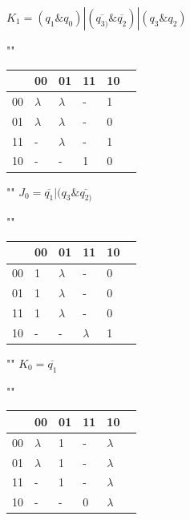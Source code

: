 \documentclass[a4paper,12pt]{article}
\begin{document}
\begin{center}
	\clearpage
	$K_{1} = (q_{1} \& q_{0}) | (\overline{q_{3)}} \& \overline{q_{2}}) | (q_{3} \& q_{2})$
	
	""\newline
	\begin{tabular}{ | l | l | l | l | l | p{1cm} |}
		\hline
		\diagbox[width=5em]{$q_{3}q_{2}$}{$q_{1}q_{0}$} & 00 & 01 & 11 & 10 \\\hline
		00 & \cellcolor{blue!25} $\lambda$  & \cellcolor{blue!25} $\lambda$  & \cellcolor{blue!25} - & \cellcolor{blue!25} 1  \\\hline
		01 & $\lambda$  &  $\lambda$  & \cellcolor{blue!25} - & 0  \\\hline
		11 & \cellcolor{blue!25} -  & \cellcolor{blue!25} $\lambda$  & \cellcolor{blue!25} - & \cellcolor{blue!25} 1  \\\hline
		10 & -  & - & \cellcolor{blue!25} 1  & 0  \\ 
		\hline
	\end{tabular}

	""\newline\newline
	$J_{0} = \overline{q_{1}} | (q_{3} \& \overline{q_{2)}}$
	
	""\newline
	\begin{tabular}{ | l | l | l | l | l | p{1cm} |}
		\hline
		\diagbox[width=5em]{$q_{3}q_{2}$}{$q_{1}q_{0}$} & 00 & 01 & 11 & 10 \\\hline
		00 & \cellcolor{blue!25} 1  & \cellcolor{blue!25} $\lambda$  & - & 0  \\\hline
		01 & \cellcolor{blue!25} 1  & \cellcolor{blue!25} $\lambda$  & - & 0  \\\hline
		11 & \cellcolor{blue!25} 1  & \cellcolor{blue!25} $\lambda$  & - & 0  \\\hline
		10 & \cellcolor{blue!25} -  & \cellcolor{blue!25} - & \cellcolor{blue!25} $\lambda$  & \cellcolor{blue!25} 1  \\ 
		\hline
	\end{tabular}

	""\newline\newline
	$K_{0} = \overline{q_{1}}$
	
	""\newline
	\begin{tabular}{ | l | l | l | l | l | p{1cm} |}
		\hline
		\diagbox[width=5em]{$q_{3}q_{2}$}{$q_{1}q_{0}$} & 00 & 01 & 11 & 10 \\\hline
		00 & \cellcolor{blue!25} $\lambda$  & \cellcolor{blue!25} 1  & - & $\lambda$  \\\hline
		01 & \cellcolor{blue!25} $\lambda$  & \cellcolor{blue!25} 1  & - & $\lambda$  \\\hline
		11 & \cellcolor{blue!25} -  & \cellcolor{blue!25} 1 & - & $\lambda$  \\\hline
		10 & \cellcolor{blue!25} -  & \cellcolor{blue!25} - & 0  & $\lambda$  \\ 
		\hline
	\end{tabular}

\end{center}
\end{document}

